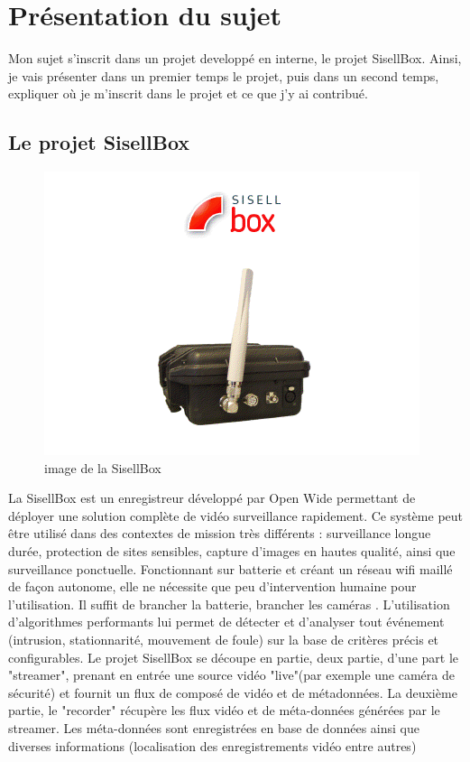\chapter{Présentation du sujet}
Mon sujet s'inscrit dans un projet developpé en interne, le projet SisellBox. Ainsi,
je vais présenter dans un premier temps le projet, puis dans un second temps,
expliquer où je m'inscrit dans le projet et ce que j'y ai contribué.



\section{Le projet SisellBox}
\label{sisselbox}

\begin{figure}[!h]
  \centering
  \includegraphics[scale=0.7]{figures/sbox}
  \caption{image de la SisellBox}
\end{figure}
\newpage
La SisellBox est un enregistreur développé par Open Wide permettant de déployer une solution complète de vidéo surveillance rapidement.
Ce système peut être utilisé dans des contextes de mission très différents : surveillance longue durée, protection de sites sensibles, capture d'images en hautes qualité, ainsi que surveillance ponctuelle.
Fonctionnant sur batterie et créant un réseau wifi maillé de façon autonome, elle ne nécessite que peu d'intervention humaine pour l'utilisation. Il suffit de brancher la batterie, brancher les caméras . L'utilisation d'algorithmes performants lui permet de détecter et d'analyser tout événement (intrusion, stationnarité, mouvement de foule) sur la base de critères précis et configurables. Le projet SisellBox se découpe en partie, deux partie, d'une part le "streamer", prenant en entrée une source vidéo "live"(par exemple une caméra de sécurité) et fournit un flux de composé de vidéo et de métadonnées. La deuxième partie, le "recorder" récupère les flux vidéo et de méta-données générées par le streamer. Les méta-données sont enregistrées en base de données ainsi que diverses informations (localisation des enregistrements vidéo entre autres)

